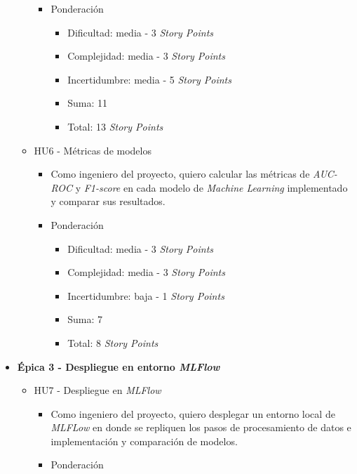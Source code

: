 \documentclass[
11pt, %
]{charter}
\begin{document}
\begin{itemize}
\begin{itemize}
\begin{itemize}
            \item Ponderación
            \begin{itemize}
                \item Dificultad: media - 3 \textit{Story Points}
                \item Complejidad: media - 3 \textit{Story Points}
                \item Incertidumbre: media - 5 \textit{Story Points}
                \item Suma: 11
                \item Total: 13 \textit{Story Points}
            \end{itemize}
        \end{itemize}
      \item HU6 - Métricas de modelos
        \begin{itemize}
            \item Como ingeniero del proyecto, quiero calcular las métricas de \textit{AUC-ROC} y \textit{F1-score} en cada modelo de \textit{Machine Learning} implementado y comparar sus resultados.
            \item Ponderación
            \begin{itemize}
                \item Dificultad: media - 3 \textit{Story Points}
                \item Complejidad: media - 3 \textit{Story Points}
                \item Incertidumbre: baja - 1 \textit{Story Points}
                \item Suma: 7
                \item Total: 8 \textit{Story Points}
            \end{itemize}
        \end{itemize}
    \end{itemize}
\newpage    
  \item \textbf{\'{E}pica 3 - Despliegue en entorno \textit{MLFlow}}
    \begin{itemize}
      \item HU7 - Despliegue en \textit{MLFlow}
        \begin{itemize}
            \item Como ingeniero del proyecto, quiero desplegar un entorno local de \textit{MLFLow} en donde se repliquen los pasos de procesamiento de datos e implementación y comparación de modelos.
            \item Ponderación
            \begin{itemize}

\end{itemize}
\end{itemize}
\end{itemize}
\end{itemize}
\end{document}
